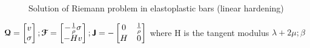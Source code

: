 \begin{figure}[h!]
  \centering
  \caption{Solution of Riemann problem in elastoplastic bars (linear hardening)}
  \label{fig:EP_bar_solution}
\end{figure}
${\boldsymbol{\mathcal{Q}}}=\left[\begin{matrix}v \\ \sigma\end{matrix}\right] ;{\boldsymbol{\mathcal{F}}}=\left[\begin{matrix}-\frac{1}{\rho}\sigma \\ -H v\end{matrix}\right] ; \boldsymbol{\mathsf{J}}=-\left[\begin{matrix}0 & \frac{1}{\rho}\\ H& 0 \end{matrix}\right] $ where H is the tangent modulus $\lambda+2\mu ; \beta$

